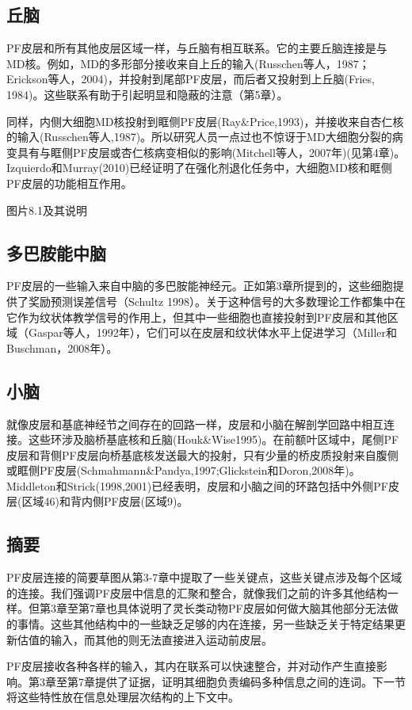 \subsection{丘脑}
\par
PF皮层和所有其他皮层区域一样，与丘脑有相互联系。它的主要丘脑连接是与MD核。例如，MD的多形部分接收来自上丘的输入(Russchen等人，1987；Erickson等人，2004)，并投射到尾部PF皮层，而后者又投射到上丘脑(Fries, 1984)。这些联系有助于引起明显和隐蔽的注意（第5章）。
\par
同样，内侧大细胞MD核投射到眶侧PF皮层(Ray$\&$Price,1993)，并接收来自杏仁核的输入(Russchen等人,1987)。所以研究人员一点过也不惊讶于MD大细胞分裂的病变具有与眶侧PF皮层或杏仁核病变相似的影响(Mitchell等人，2007年)(见第4章)。Izquierdo和Murray(2010)已经证明了在强化剂退化任务中，大细胞MD核和眶侧PF皮层的功能相互作用。

图片8.1及其说明

\subsection{多巴胺能中脑}
\par
PF皮层的一些输入来自中脑的多巴胺能神经元。正如第3章所提到的，这些细胞提供了奖励预测误差信号（Schultz 1998）。关于这种信号的大多数理论工作都集中在它作为纹状体教学信号的作用上，但其中一些细胞也直接投射到PF皮层和其他区域（Gaspar等人，1992年），它们可以在皮层和纹状体水平上促进学习（Miller和Buschman，2008年）。

\subsection{小脑}
\par
就像皮层和基底神经节之间存在的回路一样，皮层和小脑在解剖学回路中相互连接。这些环涉及脑桥基底核和丘脑(Houk\&Wise1995)。在前额叶区域中，尾侧PF皮层和背侧PF皮层向桥基底核发送最大的投射，只有少量的桥皮质投射来自腹侧或眶侧PF皮层(Schmahmann\&Pandya,1997;Glickstein和Doron,2008年)。Middleton和Strick(1998,2001)已经表明，皮层和小脑之间的环路包括中外侧PF皮层(区域46)和背内侧PF皮层(区域9)。

\subsection{摘要}
\par
PF皮层连接的简要草图从第3-7章中提取了一些关键点，这些关键点涉及每个区域的连接。我们强调PF皮层中信息的汇聚和整合，就像我们之前的许多其他结构一样。但第3章至第7章也具体说明了灵长类动物PF皮层如何做大脑其他部分无法做的事情。这些其他结构中的一些缺乏足够的内在连接，另一些缺乏关于特定结果更新估值的输入，而其他的则无法直接进入运动前皮层。
\par
PF皮层接收各种各样的输入，其内在联系可以快速整合，并对动作产生直接影响。第3章至第7章提供了证据，证明其细胞负责编码多种信息之间的连词。下一节将这些特性放在信息处理层次结构的上下文中。

